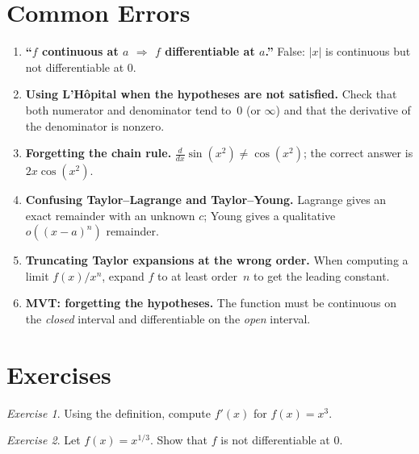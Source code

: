 \documentclass[12pt,a4paper,openany]{book}
\theoremstyle{definition}
\theoremstyle{remark}
\newtheorem{exercise}{Exercise}[chapter]
\begin{document}
\section{Common Errors}

\begin{tcolorbox}[colback=red!4,colframe=red!70!black,
  title={Frequent mistakes in Chapter~6}]
\begin{enumerate}[nosep]
\item \textbf{``$f$ continuous at $a$ $\Rightarrow$ $f$ differentiable
  at $a$.''}\;
  False: $|x|$ is continuous but not differentiable at $0$.
\item \textbf{Using L'H\^opital when the hypotheses are not satisfied.}\;
  Check that both numerator and denominator tend to~$0$ (or $\infty$)
  and that the derivative of the denominator is nonzero.
\item \textbf{Forgetting the chain rule.}\;
  $\frac{d}{dx}\sin(x^2)\neq\cos(x^2)$; the correct answer is
  $2x\cos(x^2)$.
\item \textbf{Confusing Taylor--Lagrange and Taylor--Young.}\;
  Lagrange gives an exact remainder with an unknown $c$;
  Young gives a qualitative $o((x-a)^n)$ remainder.
\item \textbf{Truncating Taylor expansions at the wrong order.}\;
  When computing a limit $f(x)/x^n$, expand $f$ to at least
  order~$n$ to get the leading constant.
\item \textbf{MVT: forgetting the hypotheses.}\;
  The function must be continuous on the \emph{closed} interval and
  differentiable on the \emph{open} interval.
\end{enumerate}
\end{tcolorbox}

\section{Exercises}

\begin{exercise}\label{exo:ch6-1}
Using the definition, compute $f'(x)$ for $f(x)=x^3$.
\end{exercise}

\begin{exercise}\label{exo:ch6-2}
Let $f(x)=x^{1/3}$.  Show that $f$ is not differentiable at $0$.
\end{exercise}
\end{document}
